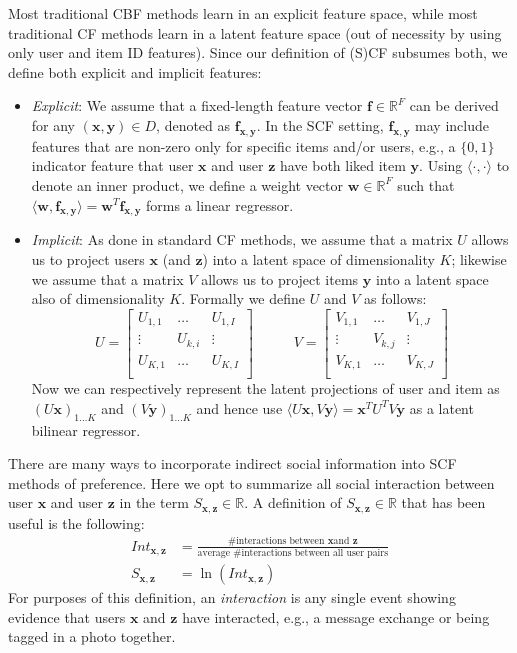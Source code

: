 \documentclass[11pt,a4paper]{article}
\newcommand{\R}{\mathbb{R}}
\newcommand{\x}{\vec{x}}
\newcommand{\y}{\vec{y}}
\newcommand{\z}{\vec{z}}
\newcommand{\w}{\vec{w}}
\newcommand{\f}{\vec{f}}
\newcommand{\la}{\langle}
\newcommand{\ra}{\rangle}
\renewcommand{\vec}[1]{\mathbf{#1}}
\begin{document}
Most traditional CBF methods learn in an explicit
feature space, while most traditional CF methods learn in a
latent feature space (out of necessity by using only user and item ID
features).  Since our definition of (S)CF subsumes both, we define 
both explicit and implicit features:
\begin{itemize}
\item {\it Explicit}: We assume that a fixed-length feature vector
$\f \in \mathbb{R}^F$ can be derived for any $(\x,\y) \in D$, denoted
as $\f_{\x,\y}$.  In the SCF setting, $\f_{\x,\y}$ may include features
that are non-zero only for specific items and/or users, e.g., a $\{0,1\}$ 
indicator feature that user $\x$
and user $\z$ have both liked item $\y$.  Using
$\la \cdot,\cdot \ra$ to 
denote an inner product, we define a weight
vector $\w \in \R^F$ such that $\la \w, \f_{\x,\y} \ra = \w^T \f_{\x,\y}$ forms 
a linear regressor.
\item {\it Implicit}: As done in standard CF methods, we assume that
a matrix $U$ allows us to project users $\x$ (and $\z$)
into a latent space of dimensionality $K$; likewise we assume that
a matrix $V$ allows us to project items $\y$ into a latent
space also of dimensionality $K$.  Formally we define $U$ and $V$
as follows:
\begin{equation*}
U = 
\begin{bmatrix}
  U_{1,1} & \hdots  & U_{1,I} \\
  \vdots  & U_{k,i} & \vdots  \\
  U_{K,1} & \hdots  & U_{K,I} \\
\end{bmatrix}
\qquad \; \; \;
V = 
\begin{bmatrix}
  V_{1,1} & \hdots  & V_{1,J} \\
  \vdots  & V_{k,j} & \vdots  \\
  V_{K,1} & \hdots  & V_{K,J} \\
\end{bmatrix}
\end{equation*}
Now we can respectively represent the latent projections of user and
item as $(U \x)_{1 \ldots K}$ and $(V \y)_{1 \ldots K}$ and
hence use $\la U \x, V \y \ra = \x^T U^T V \y$ as a latent bilinear regressor.
\end{itemize}

There are many ways to incorporate indirect social information into
SCF methods of preference.  Here we opt to summarize all social
interaction between user $\x$ and user $\z$ in the term $S_{\x,\z} \in
\R$.  A definition of $S_{\x,\z} \in \R$ that has been useful is the
following:
\begin{align}
\mathit{Int}_{\x,\z} & = \frac{\mbox{\# interactions between $\x$
and $\z$}}{\mbox{average \# interactions between all user pairs}}\\
S_{\x,\z} & = \ln \left( \mathit{Int}_{\x,\z} \right)
\end{align}
For purposes of this definition, an \emph{interaction} is any single event
showing evidence that users $\x$ and $\z$ have 
interacted, e.g., a message exchange or being tagged in a photo together.
\end{document}
